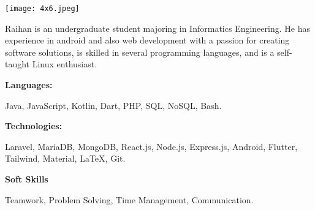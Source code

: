 \documentclass[9pt]{developercv} %
\begin{document}
\begin{minipage}[t]{0.20\textwidth}
	\vspace{-6pt}
	\vspace{5mm}
	\texttt{[image: 4x6.jpeg]}
\end{minipage}
%
%
\hfill %
\begin{minipage}[t]{0.75\textwidth}

	\vspace{-6pt}

	Raihan is an undergraduate student majoring in Informatics Engineering. He has experience in android and also web development with a passion for creating software solutions, is skilled in several programming languages, and is a self-taught Linux enthusiast.

	\vspace{-6pt}

	\begin{minipage}[t]{0.2\textwidth}
		\textbf{Languages:}
	\end{minipage}
	\hfill
	\begin{minipage}[t]{0.73\textwidth}
		Java, JavaScript, Kotlin, Dart, PHP, SQL, NoSQL, Bash.
	\end{minipage}
	\vspace{4mm}

	\begin{minipage}[t]{0.2\textwidth}
		\textbf{Technologies:}
	\end{minipage}
	\hfill
	\begin{minipage}[t]{0.73\textwidth}
		Laravel, MariaDB, MongoDB, React.js, Node.js, Express.js, Android, Flutter, Tailwind, Material, LaTeX, Git.
	\end{minipage}
	\vspace{4mm}

	\begin{minipage}[t]{0.2\textwidth}
		\textbf{Soft Skills}
	\end{minipage}
	\hfill
	\begin{minipage}[t]{0.73\textwidth}
		Teamwork, Problem Solving, Time Management, Communication.
	\end{minipage}
	\vspace{4mm}

\end{minipage}
\end{document}
